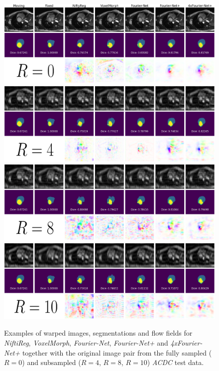 \begin{figure}[H]
	\centering
	\graphicspath{{images/}{\main/images/}}
	\includegraphics[width=.94\textwidth]{TestExamples_Mode0.pdf}
    	\includegraphics[width=.94\textwidth]{TestExamples_Mode1.pdf}
    	\includegraphics[width=.94\textwidth]{TestExamples_Mode2.pdf}
    	\includegraphics[width=.94\textwidth]{TestExamples_Mode3.pdf}	
	\caption{\small Examples of warped images, segmentations and flow fields for \emph{NiftiReg}, \emph{VoxelMorph}, \emph{Fourier-Net}, \emph{Fourier-Net+} and \emph{4xFourier-Net+} together with the original image pair from the fully sampled ($R=0$) and subsampled ($R=4$, $R=8$, $R=10$) \emph{ACDC} test data.}
	\label{fig:TestExamples}
\end{figure}


